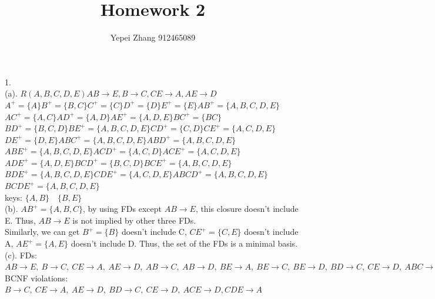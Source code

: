 \documentclass[12pt]{article}
\title{Homework 2}
\author{Yepei Zhang 912465089}
\begin{document}
\maketitle

1.\\

(a). $R(A,B,C,D,E)$\quad $AB\rightarrow E, B\rightarrow C, CE\rightarrow A, AE\rightarrow D$\\
$A^{+} = \{A\}$\quad $B^{+}=\{B,C\}$\quad$C^{+} = \{C\}$\quad $D^{+} = \{D\}$\quad $E^{+} = \{E\}$\quad $AB^{+} = \{A,B,C,D,E\}$\\
$AC^{+} = \{A,C\}$\quad $AD^{+} = \{A,D\}$\quad $AE^{+} = \{A,D,E\}$\quad $BC^{+} = \{BC\}$\\
$BD^{+} = \{B,C,D\}$\quad $BE^{+} = \{A,B,C,D,E\}$\quad $CD^{+} = \{C,D\}$\quad $CE^{+} = \{A,C,D,E\}$\\
$DE^{+} = \{D,E\}$\quad $ABC^{+} = \{A,B,C,D,E\}$\quad $ABD^{+} = \{A,B,C,D,E\}$\\
$ABE^{+} = \{A,B,C,D,E\}$\quad $ACD^{+} = \{A,C,D\}$\quad $ACE^{+} = \{A,C,D,E\}$\\
$ADE^{+} = \{A,D,E\}$\quad $BCD^{+} = \{B,C,D\}$\quad $BCE^{+} = \{A,B,C,D,E\}$\\
$BDE^{+} = \{A,B,C,D,E\}$\quad $CDE^{+} = \{A,C,D,E\}$\quad $ABCD^{+} = \{A,B,C,D,E\}$\quad $BCDE^{+} = \{A,B,C,D,E\}$\\

keys: $\{A,B\}\quad \{B,E\}$\\

(b). $AB^{+} = \{A,B,C\}$, by using FDs except $AB\rightarrow E$, this closure doesn't include E. Thus, $AB\rightarrow E$ is not implied by other three FDs.\\
Similarly, we can get $B^{+} = \{B\}$ doesn't include C, $CE^{+} = \{C,E\}$ doesn't include A, $AE^{+} = \{A,E\}$ doesn't include D. Thus, the set of the FDs is a minimal basis.\\

(c). FDs: \quad $AB\rightarrow E,\ B\rightarrow C,\ CE\rightarrow A,\ AE\rightarrow D,\ AB\rightarrow C,\ AB\rightarrow D,\ BE\rightarrow A,\ BE\rightarrow C,\ BE\rightarrow  D,\ BD\rightarrow C,\ CE\rightarrow D,\ ABC\rightarrow D,\ ABC\rightarrow E,\ ABD\rightarrow C,\ ABD\rightarrow E,\ ABE\rightarrow C,\ ABE\rightarrow D,\ ACE\rightarrow D,\ BCE\rightarrow A,\ BCE\rightarrow D,\ BDE\rightarrow A,\ BDE\rightarrow C,\ CDE\rightarrow A,\ ABCD\rightarrow E,\ BCDE\rightarrow A$\\
BCNF violations: $B\rightarrow C,\ CE\rightarrow A,\ AE\rightarrow D,\ BD\rightarrow C,\ CE\rightarrow D,\ ACE\rightarrow D, CDE\rightarrow A$\\
\end{document}
